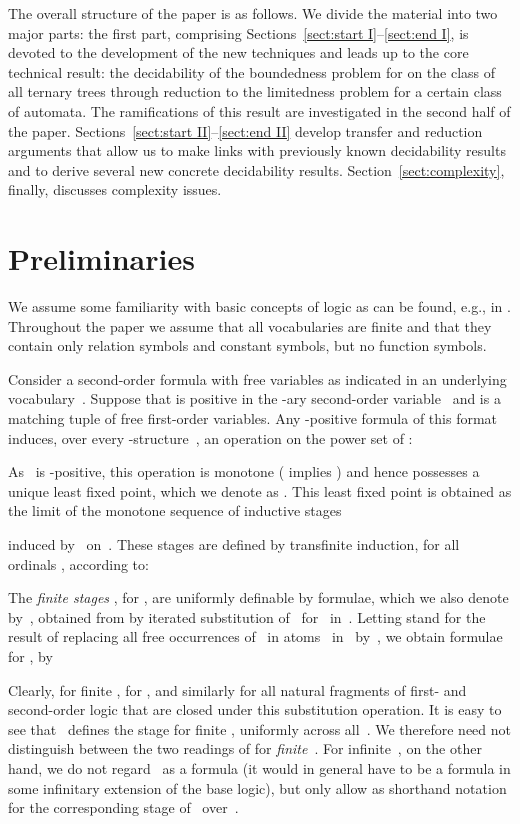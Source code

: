 \documentclass{LMCS}
\begin{document}
The overall structure of the paper is as follows.
We divide the material into two major parts\?:
the first part, comprising Sections~\ref{sect:start I}--\ref{sect:end I},
is devoted to the development of the
new techniques and leads up to the core technical result\?:
the decidability of the boundedness problem for 
on the class of all ternary trees
through reduction to the limitedness problem for a certain class of automata.
The ramifications of this result are investigated
in the second half of the paper. 
Sections~\ref{sect:start II}--\ref{sect:end II} develop
transfer and reduction arguments that allow us to make links with previously
known decidability results and to derive several new concrete
decidability results. 
Section~\ref{sect:complexity}, finally, discusses complexity issues.

\section{Preliminaries}
\label{sect:prelims}

We assume some familiarity with basic concepts of logic
as can be found, e.g., in \cite{EbbinghausFlum95}.
Throughout the paper we assume that all vocabularies are finite
and that they contain only relation symbols and constant symbols,
but no function symbols.

Consider a second-order formula 
with free variables as indicated in an underlying vocabulary~.
Suppose that  is positive in the -ary
second-order variable~ and  is a matching
tuple of free first-order variables.
Any -positive formula of this format induces, over every
-structure~, an operation on the power set of \?:


As ~is -positive, this operation is monotone
( implies )
and hence possesses a unique least fixed point,
which we denote as . This least fixed point
is obtained as the limit of the monotone sequence of inductive stages

induced by~ on~. These stages are defined by transfinite
induction, for all ordinals , according to\?:


The \emph{finite stages} , for ,
are uniformly definable by formulae, which we also denote by~,
obtained from  by iterated substitution
of~ for~ in~.
Letting  stand for the result of
replacing all free occurrences of~ in atoms~
in~ by~, we obtain
formulae~ for , by


Clearly, for finite ,  for ,
and similarly for all natural fragments of first- and second-order logic that
are closed under this substitution operation. It is easy to see that
~defines the stage 
for finite , uniformly across all~. We therefore need not
distinguish between the two readings of  for
\emph{finite}~. For infinite~, on the other hand,
we do not regard~ as a formula (it would in general have to be
a formula in some infinitary extension of the base logic), but only
allow  as shorthand notation for the corresponding stage
of~ over~.
\end{document}
